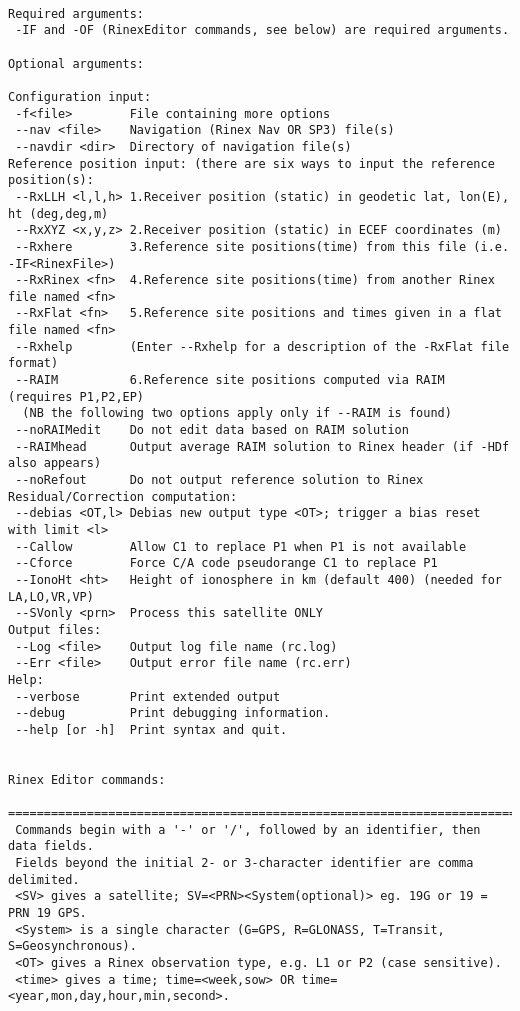 \begin{\outputsize}
\begin{verbatim}

Required arguments:
 -IF and -OF (RinexEditor commands, see below) are required arguments.

Optional arguments:

Configuration input:
 -f<file>        File containing more options
 --nav <file>    Navigation (Rinex Nav OR SP3) file(s)
 --navdir <dir>  Directory of navigation file(s)
Reference position input: (there are six ways to input the reference position(s):
 --RxLLH <l,l,h> 1.Receiver position (static) in geodetic lat, lon(E), ht (deg,deg,m)
 --RxXYZ <x,y,z> 2.Receiver position (static) in ECEF coordinates (m)
 --Rxhere        3.Reference site positions(time) from this file (i.e. -IF<RinexFile>)
 --RxRinex <fn>  4.Reference site positions(time) from another Rinex file named <fn>
 --RxFlat <fn>   5.Reference site positions and times given in a flat file named <fn>
 --Rxhelp        (Enter --Rxhelp for a description of the -RxFlat file format)
 --RAIM          6.Reference site positions computed via RAIM (requires P1,P2,EP)
  (NB the following two options apply only if --RAIM is found)
 --noRAIMedit    Do not edit data based on RAIM solution
 --RAIMhead      Output average RAIM solution to Rinex header (if -HDf also appears)
 --noRefout      Do not output reference solution to Rinex
Residual/Correction computation:
 --debias <OT,l> Debias new output type <OT>; trigger a bias reset with limit <l>
 --Callow        Allow C1 to replace P1 when P1 is not available
 --Cforce        Force C/A code pseudorange C1 to replace P1
 --IonoHt <ht>   Height of ionosphere in km (default 400) (needed for LA,LO,VR,VP)
 --SVonly <prn>  Process this satellite ONLY
Output files:
 --Log <file>    Output log file name (rc.log)
 --Err <file>    Output error file name (rc.err)
Help:
 --verbose       Print extended output
 --debug         Print debugging information.
 --help [or -h]  Print syntax and quit.


Rinex Editor commands:
 ==============================================================================
 Commands begin with a '-' or '/', followed by an identifier, then data fields.
 Fields beyond the initial 2- or 3-character identifier are comma delimited.
 <SV> gives a satellite; SV=<PRN><System(optional)> eg. 19G or 19 = PRN 19 GPS.
 <System> is a single character (G=GPS, R=GLONASS, T=Transit, S=Geosynchronous).
 <OT> gives a Rinex observation type, e.g. L1 or P2 (case sensitive).
 <time> gives a time; time=<week,sow> OR time=<year,mon,day,hour,min,second>.


\end{verbatim}
\end{\outputsize}
